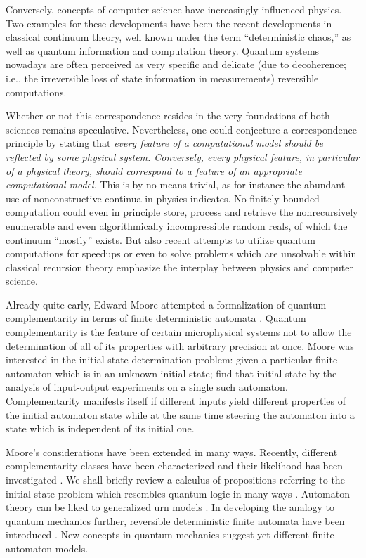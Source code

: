 Conversely, concepts of computer science have increasingly
influenced physics. Two examples for these developments have been
the recent developments in classical continuum theory, well known
under the term ``deterministic chaos,''
as well as quantum information and computation theory.
Quantum systems nowadays are often perceived as very specific and delicate
(due to decoherence; i.e., the irreversible loss of state information in measurements)
reversible computations.

Whether or not this correspondence resides in the very foundations of both sciences
remains speculative. Nevertheless, one could conjecture a correspondence principle by
stating that
{\em every feature of a computational model should be reflected by some physical system.
Conversely, every physical feature, in particular of a physical theory,
should correspond to a feature of an appropriate
computational model.}
This is by no means trivial, as for instance the abundant use of nonconstructive continua
in physics indicates.
No finitely bounded computation could even in principle store, process
and retrieve the nonrecursively enumerable
and even algorithmically incompressible random reals,
of which the continuum ``mostly'' exists.
But also recent attempts to utilize quantum computations for speedups or even to solve
problems which are unsolvable within classical recursion theory \cite{2002-cal-pav}
emphasize the interplay between
physics and computer science.


Already quite early, Edward Moore attempted a formalization of quantum complementarity
in terms of finite deterministic automata \cite{e-f-moore}.
Quantum complementarity is the feature of certain microphysical systems
not to allow the determination of all of its properties with arbitrary precision at once.
Moore was interested in the initial state determination problem: given
a particular finite automaton which is in an unknown initial state; find that
initial state by the analysis of input-output experiments on a single such automaton.
Complementarity manifests itself if different inputs yield different properties
of the initial automaton state while at the same time steering the automaton into
a state which is independent of its initial one.

Moore's considerations have been extended in many ways.
Recently, different complementarity classes have been characterized
\cite{cal-sv-yu} and their likelihood  has been
investigated \cite{e-calude-lip,cal-cal-k}.
We shall briefly review
a calculus of propositions referring to the initial state problem
which resembles quantum logic in many ways \cite{svozil-93,svozil-ql}.
Automaton theory can be liked to generalized urn models
\cite{svozil-2001-eua}.
In developing the analogy to quantum mechanics further,
reversible deterministic finite automata have been introduced
\cite{sv-aut-rev}.
New concepts in quantum mechanics \cite{zeil-99} suggest
yet different finite automaton models.




